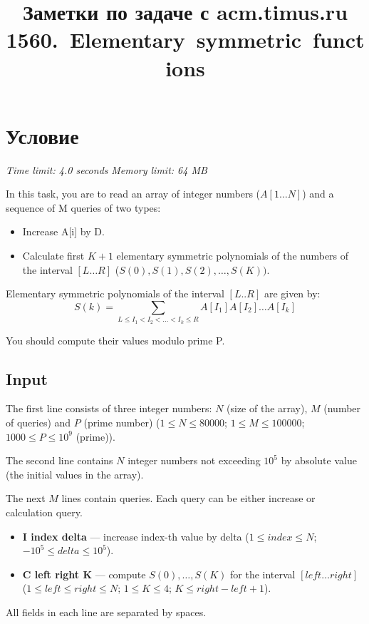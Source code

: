 \documentclass[draft]{article}
\title{Заметки по задаче с acm.timus.ru \hbox {1560. Elementary symmetric functions}}
\begin{document}
\maketitle

\section{Условие}
\Eng
{\it Time limit: 4.0 seconds}\newline
{\it Memory limit: 64 MB}

In this task, you are to read an array of integer numbers ($A[1 \ldots N]$) and a sequence of M queries of two types:
\begin{itemize}
  \item {Increase A[i] by D.}
  \item {Calculate first $K + 1$ elementary symmetric polynomials of the numbers of the interval $[L \ldots R]$ ($S(0), S(1), S(2), \ldots, S(K))$.}
\end{itemize}

Elementary symmetric polynomials of the interval $[L..R]$ are given by:
\[ S(k) = \sum_{L \le I_1 < I_2 < \ldots < I_k \le R} {A[I_1] A[I_2] \ldots A[I_k]} \]

You should compute their values modulo prime P.

\subsection{Input}

The first line consists of three integer numbers: $N$ (size of the array), $M$ (number of queries) and $P$ (prime number) ($1 \le N \le 80000$; $1 \le M \le 100000$; $1000 \le P \le 10^9$ (prime)). 

The second line contains $N$ integer numbers not exceeding $10^5$ by absolute value (the initial values in the array).

The next $M$ lines contain queries. Each query can be either increase or calculation query.
\begin{itemize}
\item {{\bf I index delta} --- increase index-th value by delta ($1 \le index \le N$; $-10^5 \le delta \le 10^5$).}
\item {{\bf C left right K} --- compute $S(0),\ldots,S(K)$ for the interval $[left \ldots right]$ ($1 \le left \le right \le N$; $1 \le K \le 4$; $K \le right - left + 1$).} 
\end{itemize}

All fields in each line are separated by spaces. 
\end{document}

